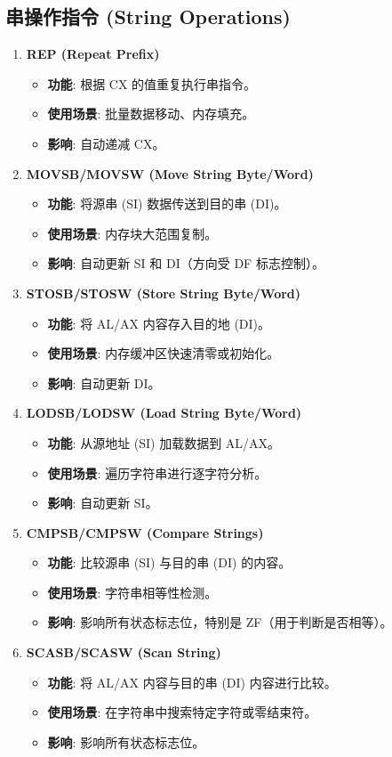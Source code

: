 \documentclass[12pt,a4paper]{ctexart}
\begin{document}
\subsection{串操作指令 (String Operations)}
\begin{enumerate}
    \item \textbf{REP (Repeat Prefix)}
    \begin{itemize}
        \item \textbf{功能}: 根据 CX 的值重复执行串指令。
        \item \textbf{使用场景}: 批量数据移动、内存填充。
        \item \textbf{影响}: 自动递减 CX。
    \end{itemize}
    \item \textbf{MOVSB/MOVSW (Move String Byte/Word)}
    \begin{itemize}
        \item \textbf{功能}: 将源串 (SI) 数据传送到目的串 (DI)。
        \item \textbf{使用场景}: 内存块大范围复制。
        \item \textbf{影响}: 自动更新 SI 和 DI（方向受 DF 标志控制）。
    \end{itemize}
    \item \textbf{STOSB/STOSW (Store String Byte/Word)}
    \begin{itemize}
        \item \textbf{功能}: 将 AL/AX 内容存入目的地 (DI)。
        \item \textbf{使用场景}: 内存缓冲区快速清零或初始化。
        \item \textbf{影响}: 自动更新 DI。
    \end{itemize}
    \item \textbf{LODSB/LODSW (Load String Byte/Word)}
    \begin{itemize}
        \item \textbf{功能}: 从源地址 (SI) 加载数据到 AL/AX。
        \item \textbf{使用场景}: 遍历字符串进行逐字符分析。
        \item \textbf{影响}: 自动更新 SI。
    \end{itemize}
    \item \textbf{CMPSB/CMPSW (Compare Strings)}
    \begin{itemize}
        \item \textbf{功能}: 比较源串 (SI) 与目的串 (DI) 的内容。
        \item \textbf{使用场景}: 字符串相等性检测。
        \item \textbf{影响}: 影响所有状态标志位，特别是 ZF（用于判断是否相等）。
    \end{itemize}
    \item \textbf{SCASB/SCASW (Scan String)}
    \begin{itemize}
        \item \textbf{功能}: 将 AL/AX 内容与目的串 (DI) 内容进行比较。
        \item \textbf{使用场景}: 在字符串中搜索特定字符或零结束符。
        \item \textbf{影响}: 影响所有状态标志位。
    \end{itemize}
\end{enumerate}
\end{document}
